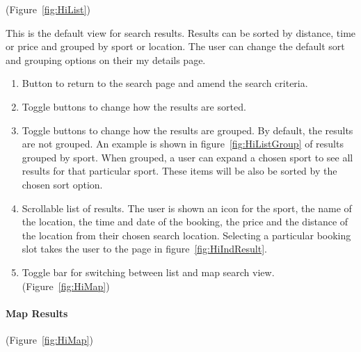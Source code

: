 (Figure~\ref{fig:HiList})


This is the default view for search results. Results can be sorted
by distance, time or price and grouped by sport or location. The user
can change the default sort and grouping options on their my details
page.
\begin{enumerate}
	\item Button to return to the search page and amend the search criteria.
	\item Toggle buttons to change how the results are sorted.
	\item Toggle buttons to change how the results are grouped. By default,
	      the results are not grouped. An example is shown in figure~\ref{fig:HiListGroup}
	      of results grouped by sport. When grouped, a user can expand a chosen
	      sport to see all results for that particular sport. These items will
	      be also be sorted by the chosen sort option.
	\item Scrollable list of results. The user is shown an icon for the sport,
	      the name of the location, the time and date of the booking, the price
	      and the distance of the location from their chosen search location.
	      Selecting a particular booking slot takes the user to the page in
	      figure~\ref{fig:HiIndResult}.
	\item Toggle bar for switching between list and map search view. (Figure~\ref{fig:HiMap})
\end{enumerate}


\paragraph{Map Results}

(Figure~\ref{fig:HiMap})


